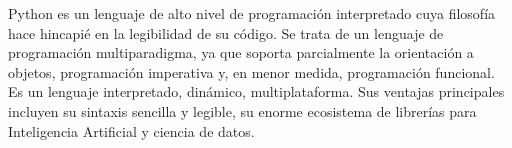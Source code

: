 Python es un lenguaje de alto nivel de programación interpretado cuya filosofía hace hincapié en la legibilidad de su código. Se trata de un lenguaje de programación multiparadigma, ya que soporta parcialmente la orientación a objetos, programación imperativa y, en menor medida, programación funcional. Es un lenguaje interpretado, dinámico, multiplataforma. Sus ventajas principales incluyen su sintaxis sencilla y legible, su enorme ecosistema de librerías para Inteligencia Artificial y ciencia de datos.